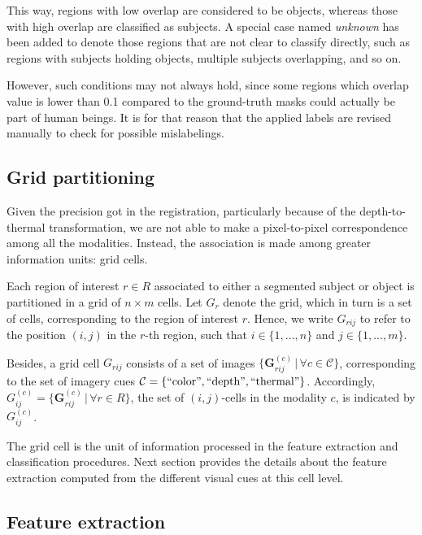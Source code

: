 \documentclass[10pt,twocolumn,letterpaper]{article}
\begin{document}
This way, regions with low overlap are considered to be objects, whereas those with high overlap are classified as subjects. A special case named \emph{unknown} has been added to denote those regions that are not clear to classify directly, such as regions with subjects holding objects, multiple subjects overlapping, and so on. 

However, such conditions may not always hold, since some regions which overlap value is lower than 0.1 compared to the ground-truth masks could actually be part of human beings. It is for that reason that the applied labels are revised manually to check for possible mislabelings.

\subsection{Grid partitioning}
\label{ssec:gridpartitioning}

Given the precision got in the registration, particularly because of the depth-to-thermal transformation, we are not able to make a pixel-to-pixel correspondence among all the modalities. Instead, the association is made among greater information units: grid cells. 

Each region of interest $r \in R$ associated to either a segmented subject or object is partitioned in a grid of $n \times m$ cells. Let $G_r$ denote the grid, which in turn is a set of cells, corresponding to the region of interest $r$. Hence, we write $G_{rij}$ to refer to the position $(i,j)$ in the $r$-th region, such that $i \in \{ 1,...,n \}$ and $j \in \{ 1,...,m \}$. 

Besides, a grid cell $G_{rij}$ consists of a set of images $\{\mathbf{G}_{rij}^{(c)} \,|\, \forall{c} \in \mathcal{C}\}$, corresponding to the set of imagery cues $\mathcal{C} = \{\mathrm{``color"}, \mathrm{``depth"}, \mathrm{``thermal"}\}$. Accordingly, $G_{ij}^{(c)} = \{\mathbf{G}_{rij}^{(c)} \,|\, \forall r \in R\}$, the set of $(i,j)$-cells in the modality $c$, is indicated by $G_{ij}^{(c)}$.

The grid cell is the unit of information processed in the feature extraction and classification procedures. Next section provides the details about the feature extraction computed from the different visual cues at this cell level.

\subsection{Feature extraction}
\label{ssec:feature extraction}
\end{document}
